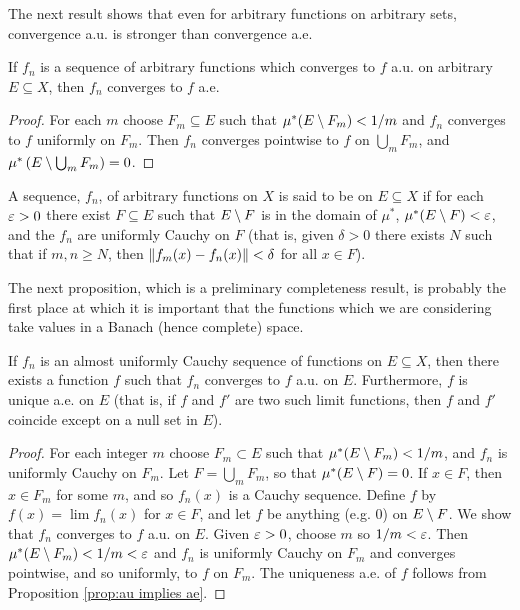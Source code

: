 The next result shows that even for arbitrary functions on arbitrary sets, convergence a.u. is stronger than convergence a.e.

\begin{proposition}
\label{prop:au implies ae}
If $f_n$ is a sequence of arbitrary functions which converges to $f$ a.u. on arbitrary $E\subseteq X$, then $f_n$ converges to $f$ a.e.
\end{proposition}

\begin{proof}
For each $m$ choose $F_m\subseteq E$ such that $\mu^*(E\setminus F_m)<1/m$ and $f_n$ converges to $f$ uniformly on $F_m$. Then $f_n$ converges pointwise to $f$ on $\bigcup_mF_m$, and $\mu^*\left(E\setminus\bigcup_m F_m\right)=0$.
\end{proof}

\begin{definition}
A sequence, $f_n$, of arbitrary functions on $X$ is said to be  on $E\subseteq X$ if for each $\varepsilon>0$ there exist $F\subseteq E$ such that $E\setminus F$ is in the domain of $\mu^*$, $\mu^*(E\setminus F)<\varepsilon$, and the $f_n$ are uniformly Cauchy on $F$ (that is, given $\delta>0$ there exists $N$ such that if $m,n\geq N$, then $\norm{f_m(x)-f_n(x)}<\delta$ for all $x\in F$).
\end{definition}

The next proposition, which is a preliminary completeness result, is probably the first place at which it is important that the functions which we are considering take values in a Banach (hence complete) space.

\begin{proposition}
\label{prop:au cauchy implies limit}
If $f_n$ is an almost uniformly Cauchy sequence of functions on $E\subseteq X$, then there exists a function $f$ such that $f_n$ converges to $f$ a.u. on $E$. Furthermore, $f$ is unique a.e. on $E$ (that is, if $f$ and $f'$ are two such limit functions, then $f$ and $f'$ coincide except on a null set in $E$).
\end{proposition}

\begin{proof}
For each integer $m$ choose $F_m\subset E$ such that $\mu^*(E\setminus F_m)<1/m$, and $f_n$ is uniformly Cauchy on $F_m$. Let $F=\bigcup_mF_m$, so that $\mu^*(E\setminus F)=0$. If $x\in F$, then $x\in F_m$ for some $m$, and so $f_n(x)$ is a Cauchy sequence. Define $f$ by $f(x)=\lim f_n(x)$ for $x\in F$, and let $f$ be anything (e.g. 0) on $E\setminus F$. We show that $f_n$ converges to $f$ a.u. on $E$. Given $\varepsilon>0$, choose $m$ so $1/m<\varepsilon$. Then $\mu^*(E\setminus F_m)<1/m<\varepsilon$ and $f_n$ is uniformly Cauchy on $F_m$ and converges pointwise, and so uniformly, to $f$ on $F_m$. The uniqueness a.e. of $f$ follows from Proposition \ref{prop:au implies ae}.
\end{proof}

